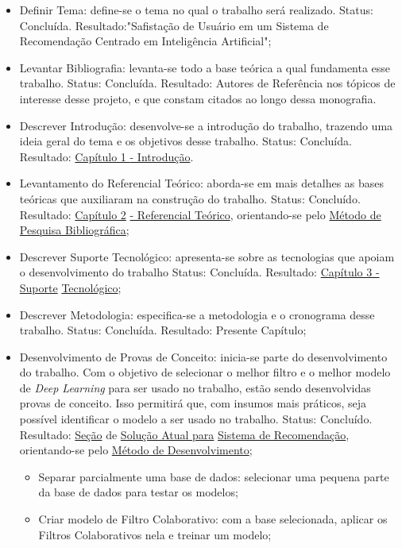 \begin{itemize}
\item Definir Tema: define-se o tema no qual o trabalho será realizado. Status: Concluída. 
Resultado:"Safistação de Usuário em um Sistema de Recomendação
Centrado em Inteligência Artificial";
\item Levantar Bibliografia: levanta-se todo a base teórica a qual fundamenta esse trabalho. Status: Concluída. 
Resultado: Autores de Referência nos tópicos de interesse desse projeto, e que constam citados ao longo dessa monografia.
\item Descrever Introdução: desenvolve-se a introdução do trabalho, trazendo uma ideia geral do tema e os objetivos desse trabalho. 
Status: Concluída. Resultado: \hyperref[chap:intro]{Capítulo 1 } \hyperref[chap:intro]{- Introdução}.
\item Levantamento do Referencial Teórico: aborda-se em mais detalhes as bases teóricas que auxiliaram na construção
do trabalho. Status: Concluído. Resultado: 
\hyperref[chap:refteor]{Capítulo 2} \hyperref[chap:refteor]{- Referencial Teórico}, orientando-se pelo \hyperref[sec:metpesq]{Método de Pesquisa Bibliográfica};
\item Descrever Suporte Tecnológico: apresenta-se sobre as tecnologias que apoiam o desenvolvimento do trabalho
Status: Concluída. Resultado: \hyperref[chap:suptec]{Capítulo 3 - Suporte} \hyperref[chap:suptec]{ Tecnológico};
\item Descrever Metodologia: especifica-se a metodologia e o cronograma desse trabalho. Status: Concluída. 
Resultado: Presente Capítulo;
\item Desenvolvimento de Provas de Conceito: inicia-se parte do desenvolvimento do trabalho. Com o objetivo de selecionar
o melhor filtro e o melhor modelo de \textit{Deep Learning} para ser usado no trabalho, estão sendo desenvolvidas provas 
de conceito. Isso permitirá que, com insumos mais práticos, seja possível identificar o modelo a ser usado no trabalho. 
Status: Concluído. Resultado: \hyperref[chap:poc]{Seção} de \hyperref[chap:proposta]{Solução Atual para} 
\hyperref[chap:proposta]{ Sistema de Recomendação}, orientando-se pelo \hyperref[sec:metdev]{Método de Desenvolvimento};
    \begin{itemize}
        \item Separar parcialmente uma base de dados: selecionar uma pequena parte da base de dados para testar os modelos;
        \item Criar modelo de Filtro Colaborativo: com a base selecionada, aplicar os Filtros Colaborativos nela e treinar um modelo;

\end{itemize}
\end{itemize}
